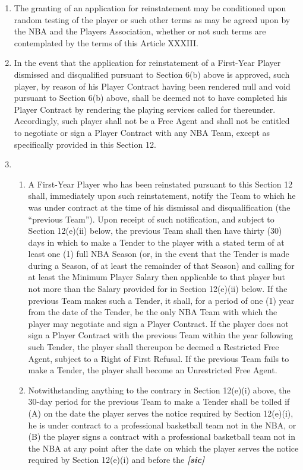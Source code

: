 \documentclass[
]{book}
\providecommand{\tightlist}{%
  \setlength{\itemsep}{0pt}\setlength{\parskip}{0pt}}
\begin{document}
\begin{enumerate}
\item
  The granting of an application for reinstatement may be conditioned upon random testing of the player or such other terms as may be agreed upon by the NBA and the Players Association, whether or not such terms are contemplated by the terms of this Article XXXIII.
\item
  In the event that the application for reinstatement of a First-Year Player dismissed and disqualified pursuant to Section 6(b) above is approved, such player, by reason of his Player Contract having been rendered null and void pursuant to Section 6(b) above, shall be deemed not to have completed his Player Contract by rendering the playing services called for thereunder. Accordingly, such player shall not be a Free Agent and shall not be entitled to negotiate or sign a Player Contract with any NBA Team, except as specifically provided in this Section 12.
\item
  \begin{enumerate}
  \def\labelenumii{(\roman{enumii})}
  \tightlist
  \item
    A First-Year Player who has been reinstated pursuant to this Section 12 shall, immediately upon such reinstatement, notify the Team to which he was under contract at the time of his dismissal and disqualification (the ``previous Team''). Upon receipt of such notification, and subject to Section 12(e)(ii) below, the previous Team shall then have thirty (30) days in which to make a Tender to the player with a stated term of at least one (1) full NBA Season (or, in the event that the Tender is made during a Season, of at least the remainder of that Season) and calling for at least the Minimum Player Salary then applicable to that player but not more than the Salary provided for in Section 12(e)(ii) below. If the previous Team makes such a Tender, it shall, for a period of one (1) year from the date of the Tender, be the only NBA Team with which the player may negotiate and sign a Player Contract. If the player does not sign a Player Contract with the previous Team within the year following such Tender, the player shall thereupon be deemed a Restricted Free Agent, subject to a Right of First Refusal. If the previous Team fails to make a Tender, the player shall become an Unrestricted Free Agent.
  \item
    Notwithstanding anything to the contrary in Section 12(e)(i) above, the 30-day period for the previous Team to make a Tender shall be tolled if (A) on the date the player serves the notice required by Section 12(e)(i), he is under contract to a professional basketball team not in the NBA, or (B) the player signs a contract with a professional basketball team not in the NBA at any point after the date on which the player serves the notice required by Section 12(e)(i) and before the \textbf{\emph{{[}sic{]}}}

\end{enumerate}
\end{enumerate}
\end{document}
